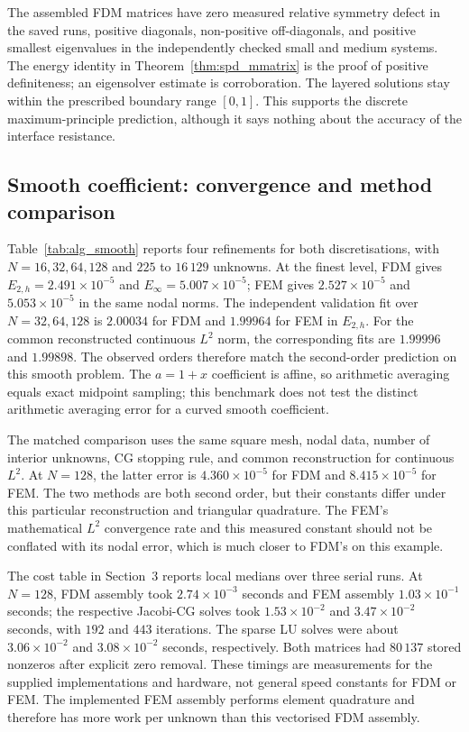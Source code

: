 The assembled FDM matrices have zero measured relative symmetry defect in
the saved runs, positive diagonals, non-positive off-diagonals, and positive
smallest eigenvalues in the independently checked small and medium systems.
The energy identity in Theorem~\ref{thm:spd_mmatrix} is the proof of positive
definiteness; an eigensolver estimate is corroboration. The layered solutions
stay within the prescribed boundary range $[0,1]$. This supports the
discrete maximum-principle prediction, although it says nothing about the
accuracy of the interface resistance.

\subsection{Smooth coefficient: convergence and method comparison}
Table~\ref{tab:alg_smooth} reports four refinements for both discretisations,
with $N=16,32,64,128$ and $225$ to $16\,129$ unknowns. At the finest level,
FDM gives $E_{2,h}=2.491\times10^{-5}$ and
$E_\infty=5.007\times10^{-5}$; FEM gives
$2.527\times10^{-5}$ and $5.053\times10^{-5}$ in the same nodal norms.
The independent validation fit over $N=32,64,128$ is $2.00034$ for FDM and
$1.99964$ for FEM in $E_{2,h}$. For the common reconstructed continuous
$L^2$ norm, the corresponding fits are $1.99996$ and $1.99898$. The observed
orders therefore match the second-order prediction on this smooth problem.
The $a=1+x$ coefficient is affine, so arithmetic averaging equals exact
midpoint sampling; this benchmark does not test the distinct arithmetic
averaging error for a curved smooth coefficient.

The matched comparison uses the same square mesh, nodal data, number of
interior unknowns, CG stopping rule, and common reconstruction for continuous
$L^2$. At $N=128$, the latter error is $4.360\times10^{-5}$ for FDM and
$8.415\times10^{-5}$ for FEM. The two methods are both second order, but
their constants differ under this particular reconstruction and triangular
quadrature. The FEM's mathematical $L^2$ convergence rate and this measured
constant should not be conflated with its nodal error, which is much closer
to FDM's on this example.

The cost table in Section~3 reports local medians over three serial runs.
At $N=128$, FDM assembly took $2.74\times10^{-3}$ seconds and FEM assembly
$1.03\times10^{-1}$ seconds; the respective Jacobi-CG solves took
$1.53\times10^{-2}$ and $3.47\times10^{-2}$ seconds, with $192$ and $443$
iterations. The sparse LU solves were about $3.06\times10^{-2}$ and
$3.08\times10^{-2}$ seconds, respectively. Both matrices had $80\,137$
stored nonzeros after explicit zero removal. These timings are measurements
for the supplied implementations and hardware, not general speed constants
for FDM or FEM. The implemented FEM assembly performs element quadrature and
therefore has more work per unknown than this vectorised FDM assembly.

